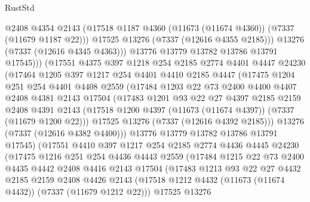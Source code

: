 \begin{lexlean}{RustStd}
\begin{coremodule}
                @2408
                @4354
                @2143
                (@17518 @1187 @4360 (@11673 (@11674 @4360)) (@7337 (@11679 @1187 @22)))
                @17525
                @13276
                (@7337 (@12616 @4355 @2185)))
              @13276
              (@7337 (@12616 @4345 @4363)))
            @13776
            @13779
            @13782
            @13786
            @13791
            @17545)))
      (@17551
        @4375
        @397
        @1218
        @254
        @2185
        @2774
        @4401
        @4447
        @24230
        (@17464
          @1205
          @397
          @1217
          @254
          @4401
          @4410
          @2185
          @4447
          (@17475
            @1204
            @251
            @254
            @4401
            @4408
            @2559
            (@17484
              @1203
              @22
              @73
              @2400
              @4400
              @4407
              @2408
              @4381
              @2143
              @17504
              (@17483
                @1201
                @93
                @22
                @27
                @4397
                @2185
                @2159
                @2408
                @4391
                @2143
                (@17518 @1200 @4397 (@11673 (@11674 @4397)) (@7337 (@11679 @1200 @22)))
                @17525
                @13276
                (@7337 (@12616 @4392 @2185)))
              @13276
              (@7337 (@12616 @4382 @4400)))
            @13776
            @13779
            @13782
            @13786
            @13791
            @17545)
          (@17551
            @4410
            @397
            @1217
            @254
            @2185
            @2774
            @4436
            @4445
            @24230
            (@17475
              @1216
              @251
              @254
              @4436
              @4443
              @2559
              (@17484
                @1215
                @22
                @73
                @2400
                @4435
                @4442
                @2408
                @4416
                @2143
                @17504
                (@17483
                  @1213
                  @93
                  @22
                  @27
                  @4432
                  @2185
                  @2159
                  @2408
                  @4426
                  @2143
                  (@17518 @1212 @4432 (@11673 (@11674 @4432)) (@7337 (@11679 @1212 @22)))
                  @17525
                  @13276

\end{coremodule}
\end{lexlean}
